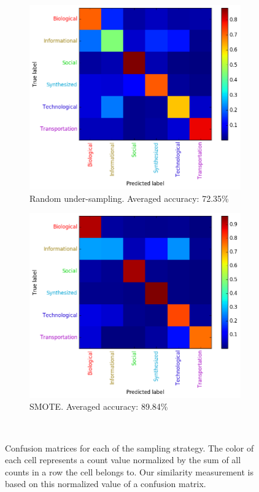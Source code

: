 \documentclass{article}
\begin{document}
\begin{figure}[H]
\medskip
\begin{subfigure}{0.48\textwidth}
\includegraphics[width=\linewidth]{figs/similarity/Domain/RandomUnder_26/confusion_RandomUnder.png}
\caption{Random under-sampling. Averaged accuracy: 72.35\%} \label{random_under_confusion}
\end{subfigure}\hspace*{\fill}
\begin{subfigure}{0.48\textwidth}
\includegraphics[width=\linewidth]{figs/similarity/Domain/SMOTE/confusion_SMOTE.png}
\caption{SMOTE. Averaged accuracy: 89.84\%} \label{smote_confusion}
\end{subfigure}
\
\caption{Confusion matrices for each of the sampling strategy. The color of each cell represents a count value normalized by the sum of all counts in a row the cell belongs to. Our similarity measurement is based on this normalized value of a confusion matrix.} \label{confusion}
\end{figure}
\end{document}
